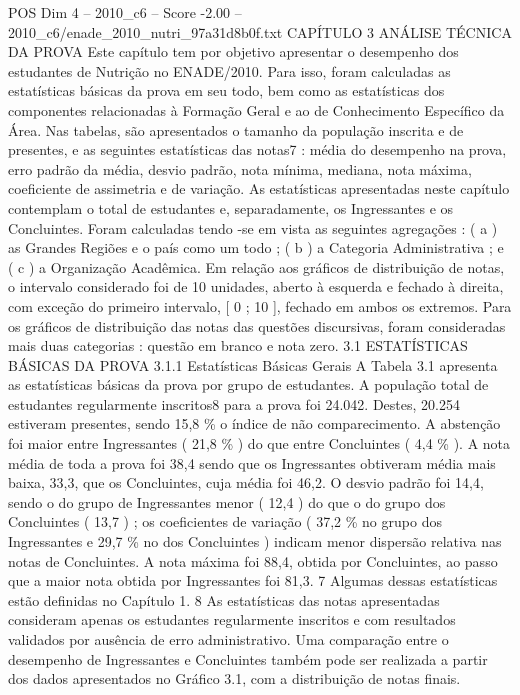 \begin{textsample}{POS Dim 4 – 2010\_c6 – Score -2.00 – 2010\_c6/enade\_2010\_nutri\_97a31d8b0f.txt}  \label{ex:f4_pos_316}
CAPÍTULO 3 ANÁLISE TÉCNICA DA PROVA Este capítulo tem por objetivo apresentar o desempenho dos estudantes de Nutrição no ENADE/2010.
Para isso, foram calculadas as estatísticas básicas da prova em seu todo, bem como as estatísticas dos componentes relacionadas à Formação Geral e ao de Conhecimento Específico da Área.
Nas tabelas, são apresentados o tamanho da população inscrita e de presentes, e as seguintes estatísticas das notas7 : média do desempenho na prova, erro padrão da média, desvio padrão, nota mínima, mediana, nota máxima, coeficiente de assimetria e de variação.
As estatísticas apresentadas neste capítulo contemplam o total de estudantes e, separadamente, os Ingressantes e os Concluintes.
Foram calculadas tendo -se em vista as seguintes agregações : ( a ) as Grandes Regiões e o país como um todo ; ( b ) a Categoria Administrativa ; e ( c ) a Organização Acadêmica.
Em relação aos gráficos de distribuição de notas, o intervalo considerado foi de 10 unidades, aberto à esquerda e fechado à direita, com exceção do primeiro intervalo, [ 0 ; 10 ], fechado em ambos os extremos.
Para os gráficos de distribuição das notas das questões discursivas, foram consideradas mais duas categorias : questão em branco e nota zero. 3.1 ESTATÍSTICAS BÁSICAS DA PROVA 3.1.1 Estatísticas Básicas Gerais A Tabela 3.1 apresenta as estatísticas básicas da prova por grupo de estudantes.
A população total de estudantes regularmente inscritos8 para a prova foi 24.042.
Destes, 20.254 estiveram presentes, sendo 15,8 \% o índice de não comparecimento.
A abstenção foi maior entre Ingressantes ( 21,8 \% ) do que entre Concluintes ( 4,4 \% ).
A nota média de toda a prova foi 38,4 sendo que os Ingressantes obtiveram média mais baixa, 33,3, que os Concluintes, cuja média foi 46,2.
O desvio padrão foi 14,4, sendo o do grupo de Ingressantes menor ( 12,4 ) do que o do grupo dos Concluintes ( 13,7 ) ; os coeficientes de variação ( 37,2 \% no grupo dos Ingressantes e 29,7 \% no dos Concluintes ) indicam menor dispersão relativa nas notas de Concluintes.
A nota máxima foi 88,4, obtida por Concluintes, ao passo que a maior nota obtida por Ingressantes foi 81,3. 7 Algumas dessas estatísticas estão definidas no Capítulo 1. 8 As estatísticas das notas apresentadas consideram apenas os estudantes regularmente inscritos e com resultados validados por ausência de erro administrativo.
Uma comparação entre o desempenho de Ingressantes e Concluintes também pode ser realizada a partir dos dados apresentados no Gráfico 3.1, com a distribuição de notas finais.

\end{textsample}
